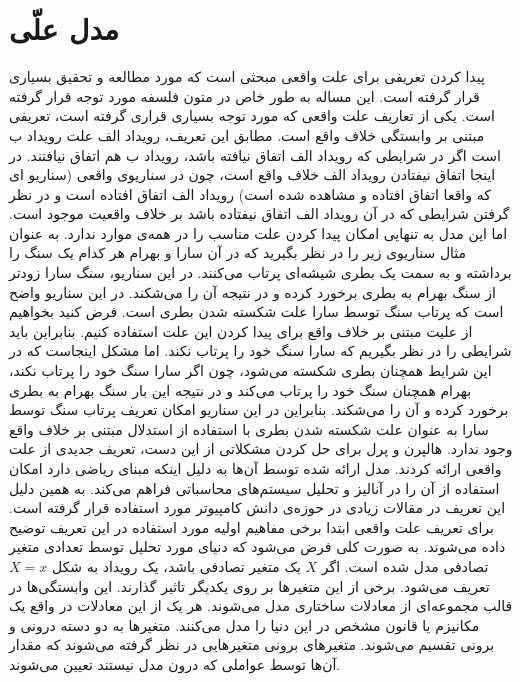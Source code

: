 \section{مدل علّی}
پیدا کردن تعریفی برای علت واقعی
مبحثی است که مورد مطالعه و تحقیق بسیاری قرار گرفته است.
این مساله به طور خاص در متون فلسفه مورد توجه قرار گرفته است.
یکی از تعاریف علت واقعی که مورد توجه بسیاری قراری گرفته است، تعریفی مبتنی بر وابستگی خلاف واقع
است.
مطابق این تعریف، رویداد الف علت رویداد ب است اگر در شرایطی که رویداد الف اتفاق نیافته باشد، رویداد ب هم اتفاق نیافتند.
در اینجا اتفاق نیفتادن رویداد الف خلاف واقع است، چون در سناریوی واقعی
(سناریو ای که واقعا اتفاق افتاده و مشاهده شده است)
رویداد الف اتفاق افتاده است و در نظر گرفتن شرایطی که در آن رویداد الف اتفاق نیفتاده باشد بر خلاف واقعیت موجود است.
اما این مدل به تنهایی امکان پیدا کردن علت مناسب را در همه‌ی موارد ندارد.
به عنوان مثال سناریوی زیر را در نظر بگیرید که در آن سارا و بهرام هر کدام یک سنگ را برداشته و به سمت یک بطری شیشه‌ای پرتاب می‌کنند.
در این سناریو، سنگ سارا زودتر از سنگ بهرام به بطری برخورد کرده و در نتیجه آن را می‌شکند.
در این سناریو واضح است که پرتاب سنگ توسط سارا علت شکسته شدن بطری است.
فرض کنید بخواهیم از علیت مبتنی بر خلاف واقع برای پیدا کردن این علت استفاده کنیم.
بنابراین باید شرایطی را در نظر بگیریم که سارا سنگ خود را پرتاب نکند.
اما مشکل اینجاست که در این شرایط همچنان بطری شکسته می‌شود، چون اگر سارا سنگ خود را پرتاب نکند، بهرام همچنان سنگ خود را پرتاب می‌کند و در نتیجه این بار سنگ بهرام به بطری برخورد کرده و آن را می‌شکند.
بنابراین در این سناریو امکان تعریف پرتاب سنگ توسط سارا به عنوان علت شکسته شدن بطری با استفاده از استدلال مبتنی بر خلاف واقع وجود ندارد.
هالپرن
و پرل
برای حل کردن مشکلاتی از این دست، تعریف جدیدی از علت واقعی
\cite{hp}
ارائه کردند.
مدل ارائه شده توسط آن‌ها به دلیل اینکه مبنای ریاضی دارد امکان استفاده از آن را در آنالیز و تحلیل سیستم‌های محاسباتی فراهم می‌کند.
به همین دلیل این تعریف در مقالات زیادی در حوزه‌ی دانش کامپیوتر مورد استفاده قرار گرفته است.
برای تعریف علت واقعی ابتدا برخی مفاهیم اولیه مورد استفاده در این تعریف توضیح داده می‌شوند.
به صورت کلی فرض می‌شود که دنیای مورد تحلیل توسط تعدادی متغیر تصادفی مدل شده است.
اگر
$X$
یک متغیر تصادفی باشد، یک رویداد به شکل
$X=x$
تعریف می‌شود.
برخی از این متغیر‌ها بر روی یکدیگر تاثیر گذارند.
این وابستگی‌ها در قالب مجموعه‌ای از معادلات ساختاری
مدل می‌شوند.
هر یک از این معادلات در واقع یک مکانیزم یا قانون مشخص در این دنیا را مدل می‌کنند.
متغیرها به دو دسته درونی
و برونی
تقسیم می‌شوند.
متغیر‌های برونی متغیر‌هایی در نظر گرفته می‌شوند که مقدار آن‌ها توسط عواملی که درون مدل نیستند تعیین می‌شوند.
